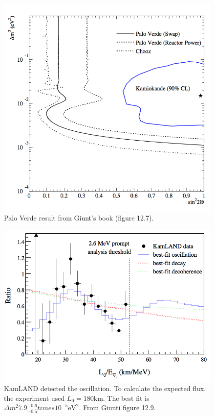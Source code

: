 \documentclass[letterpaper,12pt,english]{sphinxmanual}
\begin{document}
\begin{figure}[htbp]
\centering
\capstart

\includegraphics{paloVerdeResult.png}
\caption{Palo Verde result from Giunt's book (figure 12.7).}\end{figure}
\begin{figure}[htbp]
\centering
\capstart

\includegraphics{kamLANDOsc.png}
\caption{KamLAND detected the oscillation. To calculate the expected flux, the experiment used \(L_0 = 180 \mathrm {km}\). The best fit is \(\Delta m^2 7.9^{+0.6}_{-0.5} times 10^{-5}\mathrm{eV^2}\).  From Giunti figure 12.9.}\end{figure}
\end{document}
